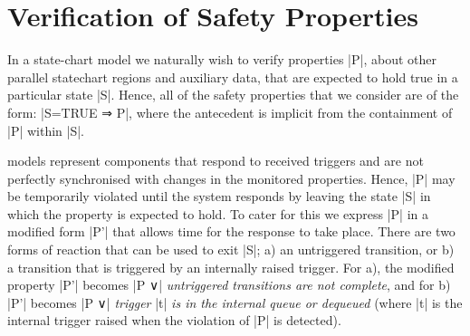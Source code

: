 

\section{Verification of Safety Properties}
\label{sec:verificationSafety}

In a state-chart model we naturally wish to verify properties |P|, about other parallel statechart regions and auxiliary data, that are expected to hold true in a particular state |S|.
Hence, all of the safety properties that we consider are of the form: |S=TRUE ⇒ P|, where the antecedent is implicit from the containment of |P| within |S|.
%

\SCXML models represent components that respond to received triggers and are not perfectly synchronised with changes in the monitored properties. 
Hence, |P| may be temporarily violated until the system responds by leaving the state |S| in which the property is expected to hold.
To cater for this we express |P| in a modified form |P'| that allows time for the response to take place.
There are two forms of reaction that can be used to exit |S|; 
a) an untriggered transition, or 
b) a transition that is triggered by an internally raised trigger.
For a), the modified property |P'| becomes |P ∨| \emph{untriggered transitions are not complete}, 
and for b) |P'| becomes |P ∨| \emph{trigger} |t| \emph{is in the internal queue or dequeued}
(where |t| is the internal trigger raised when the violation of |P| is detected).


